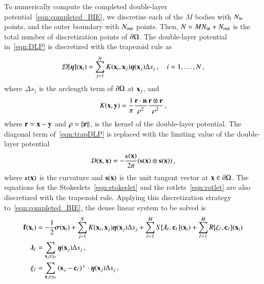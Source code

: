 \documentclass[preprint, 10pt]{elsarticle}
\begin{document}
To numerically compute the completed double-layer potential~\eqref{eqn:completed_BIE}, we discretize each of the $M$ bodies with  $N_{\mathrm{in}}$ points, and the outer boundary with $N_{\mathrm{out}}$ points.  Then, $N = MN_{\mathrm{in}} + N_{\mathrm{out}}$ is the total number of discretization points of ${\partial}\Omega$.  The double-layer potential in~\eqref{eqn:DLP} is discretized with the trapezoid rule as
\begin{align}
  {\mathcal{D}}[{\boldsymbol\eta}]({\mathbf{x}}_i) = \sum_{j=1}^{N} K({\mathbf{x}}_i,{\mathbf{x}}_j) {\boldsymbol\eta}({\mathbf{x}}_j) 
      \Delta s_{j}\, , \quad i=1,\ldots,N \, ,
  \label{eqn:trapDLP}
\end{align}
where $\Delta s_j$ is the arclength term of ${\partial}\Omega$ at
${\mathbf{x}}_j$, and
\begin{align}
  K({\mathbf{x}},{\mathbf{y}}) = \frac{1}{\pi} \frac{{\mathbf{r}} \cdot {\mathbf{n}}}{\rho^2} 
      \frac{{\mathbf{r}} \otimes {\mathbf{r}}}{\rho^2} \, ,
\end{align}
where ${\mathbf{r}} = {\mathbf{x}} - {\mathbf{y}}$ and $\rho = \|{\mathbf{r}}\|$, is the kernel of the double-layer potential.  The diagonal term of~\eqref{eqn:trapDLP} is replaced with the limiting value of the double-layer potential
\begin{align}
  D({\mathbf{x}},{\mathbf{x}}) = -\frac{\kappa({\mathbf{x}})}{2\pi}({\mathbf{s}}({\mathbf{x}}) \otimes {\mathbf{s}}({\mathbf{x}})) \, ,
\end{align}
where $\kappa({\mathbf{x}})$ is the curvature and ${\mathbf{s}}({\mathbf{x}})$ is the unit tangent vector at ${\mathbf{x}} \in {\partial}\Omega$.  The equations for the Stokeslets~\eqref{eqn:stokeslet} and the rotlets~\eqref{eqn:rotlet} are also discretized with the trapezoid rule.  Applying this discretization strategy to~\eqref{eqn:completed_BIE}, the dense linear system to be solved is
\begin{subequations}
  \label{eqn:completed_BIE_discretized}
  \begin{align}
  \label{eqn:discretized_DLP}
    {\mathbf{f}}({\mathbf{x}}_i) &= -\frac{1}{2}{\boldsymbol\sigma}({\mathbf{x}}_i) + \sum_{j=1}^{N} 
      K({\mathbf{x}}_i,{\mathbf{x}}_j) {\boldsymbol\eta}({\mathbf{x}}_j) \Delta s_{j} + 
      \sum_{\ell=1}^M S[{\boldsymbol\lambda}_\ell,{\mathbf{c}}_\ell]({\mathbf{x}}_i) +
      \sum_{\ell=1}^M R[\xi_\ell,{\mathbf{c}}_\ell]({\mathbf{x}}_i) \\
    {\boldsymbol\lambda}_\ell &= \sum_{{\mathbf{x}}_j \in \gamma_\ell} {\boldsymbol\eta}({\mathbf{x}}_j) 
      \Delta s_j \, , \\ 
    \xi_\ell &= \sum_{{\mathbf{x}}_j \in \gamma_\ell}
      {({\mathbf{x}}_j - {\mathbf{c}}_\ell)}^\perp \cdot {\boldsymbol\eta}({\mathbf{x}}_j) \Delta s_j \, ,
  \end{align}
\end{subequations}
\end{document}
